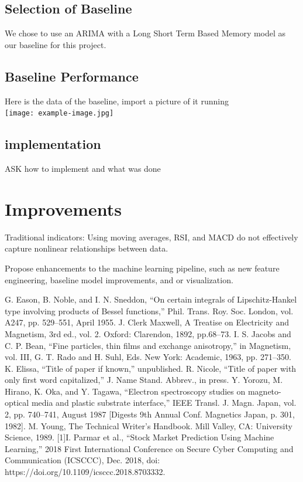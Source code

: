 \documentclass[conference]{IEEEtran}
\begin{document}
\begin{itemize}
\end{itemize}

\subsection{Selection of Baseline}
We chose to use an ARIMA with a Long Short Term Based Memory model as our baseline for this project.

\subsection{Baseline Performance}
Here is the data of the baseline, import a picture of it running
\\
\texttt{[image: example-image.jpg]}

\subsection{implementation}
ASK how to implement and what was done

\section{Improvements}
Traditional indicators: Using moving averages, RSI, and MACD do not effectively capture nonlinear relationships between data.

Propose enhancements to the machine learning pipeline, such as new feature engineering, baseline model improvements, and or visualization.




\begin{thebibliography}{00}
 G. Eason, B. Noble, and I. N. Sneddon, ``On certain integrals of Lipschitz-Hankel type involving products of Bessel functions,'' Phil. Trans. Roy. Soc. London, vol. A247, pp. 529--551, April 1955.
 J. Clerk Maxwell, A Treatise on Electricity and Magnetism, 3rd ed., vol. 2. Oxford: Clarendon, 1892, pp.68--73.
 I. S. Jacobs and C. P. Bean, ``Fine particles, thin films and exchange anisotropy,'' in Magnetism, vol. III, G. T. Rado and H. Suhl, Eds. New York: Academic, 1963, pp. 271--350.
 K. Elissa, ``Title of paper if known,'' unpublished.
 R. Nicole, ``Title of paper with only first word capitalized,'' J. Name Stand. Abbrev., in press.
 Y. Yorozu, M. Hirano, K. Oka, and Y. Tagawa, ``Electron spectroscopy studies on magneto-optical media and plastic substrate interface,'' IEEE Transl. J. Magn. Japan, vol. 2, pp. 740--741, August 1987 [Digests 9th Annual Conf. Magnetics Japan, p. 301, 1982].
 M. Young, The Technical Writer's Handbook. Mill Valley, CA: University Science, 1989.
[1]I. Parmar et al., “Stock Market Prediction Using Machine Learning,” 2018 First International Conference on Secure Cyber Computing and Communication (ICSCCC), Dec. 2018, doi: https://doi.org/10.1109/icsccc.2018.8703332.
‌
\end{thebibliography}
\vspace{12pt}
\end{document}
